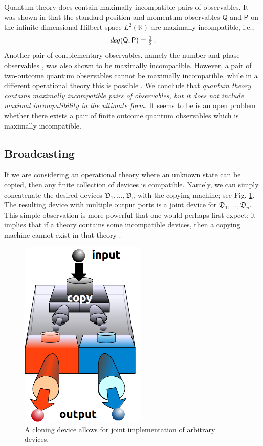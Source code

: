 \documentclass[12pt]{article}
\theoremstyle{definition}
\newcommand{\R}{\mathbb{R}} %
\newcommand{\half}{\tfrac{1}{2}} %
\newcommand{\Po}{\mathsf{P}}%
\newcommand{\Qo}{\mathsf{Q}}%
\newcommand{\Dev}{\mathfrak{D}} %
\def\deg{\textit de\kern-.5pt g}
\begin{document}
Quantum theory does contain maximally incompatible pairs of observables. 
It was shown in \cite{HeScToZi14} that the standard position and momentum observables $\Qo$ and $\Po$ on the infinite dimensional Hilbert space $L^2(\R)$ are maximally incompatible, i.e., 
\begin{equation}\label{eq:pos-mom-true}
\deg(\Qo,\Po) = \half \, .
\end{equation}
Another pair of complementary observables, namely the number and phase observables \cite{BuLaPeYl01}, was also shown to be maximally incompatible.
However, a pair of two-outcome quantum observables cannot be maximally incompatible, 
while in a different operational theory this is possible \cite{BuHeScSt13}.
We conclude that \emph{quantum theory contains maximally incompatible pairs of observables, but it does not include maximal incompatibility in the ultimate form}.
It seems to be is an open problem whether there exists a pair of finite outcome quantum observables which is maximally incompatible.


\subsection{Broadcasting}\label{sec:broadcasting}

If we are considering an operational theory where an unknown state can be copied, then any finite collection of devices is compatible. 
Namely, we can simply concatenate the desired devices $\Dev_1,\ldots,\Dev_n$ with the copying machine; see Fig. \ref{fig:cloning}.
The resulting device with multiple output ports is a joint device for $\Dev_1,\ldots,\Dev_n$.
This simple observation is more powerful that one would perhaps first expect; it implies that if a theory contains some incompatible devices, then a copying machine cannot exist in that theory \cite{QI01Werner}.

\begin{figure}\begin{center}
\includegraphics[width=6cm]{fig_cloning.png}
\caption{A cloning device allows for joint implementation of arbitrary devices.}
\label{fig:cloning}
\end{center}
\end{figure}
\end{document}

